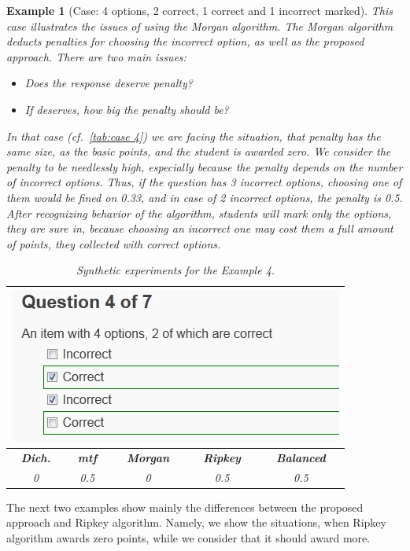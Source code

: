 \documentclass[PhD, Submit, ngerman,UKenglish,table]{scrbook}
\newtheorem{example}{Example}
\begin{document}
\begin{example}[Case: 4 options, 2 correct, 1 correct and 1 incorrect marked]
This case illustrates the issues of using the Morgan algorithm.
The Morgan algorithm deducts penalties for choosing the incorrect option, as well as the proposed approach.
There are two main issues:

\begin{itemize}
  \item Does the response deserve penalty?
  \item If deserves, how big the penalty should be?
\end{itemize}

In that case (cf.~\autoref{tab:case 4}) we are facing the situation, that penalty has the same size, as the basic points, and the student is awarded zero.
We consider the penalty to be needlessly high, especially because the penalty depends on the number of incorrect options.
Thus, if the question has 3 incorrect options, choosing one of them would be fined on 0.33, and in case of 2 incorrect options, the penalty is 0.5.
After recognizing behavior of the algorithm, students will mark only the options, they are sure in, because choosing an incorrect one may cost them a full amount of points, they collected with correct options.

\begin{table}[h!]
	\centering
	\begin{tabularx}{0.55\columnwidth}{c c c c c} 
	\toprule 
    \multicolumn{5}{c}{\includegraphics[width=0.4\columnwidth]{images/case4.jpg}}\\
    \midrule
    \textbf{Dich.}&\textbf{\gls{mtf}}&\textbf{Morgan}&\textbf{Ripkey}&\textbf{Balanced}\\
	\midrule
    0&0.5&0&0.5&0.5\\
	\bottomrule
    \end{tabularx}
	\caption{Synthetic experiments for the Example 4.}
	\label{tab:case 4}
\end{table}
\end{example}

The next two examples show mainly the differences between the proposed approach and Ripkey algorithm.
Namely, we show the situations, when Ripkey algorithm awards zero points, while we consider that it should award more. 
\end{document}
